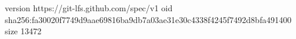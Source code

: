 version https://git-lfs.github.com/spec/v1
oid sha256:fa30020f7749d9aae69816ba9db7a03ae31e30c4338f4245f7492d8bfa491400
size 13472
